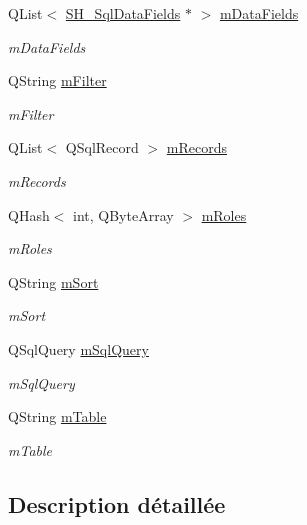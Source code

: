 \begin{DoxyCompactItemize}
\item 
Q\-List$<$ \hyperlink{classSH__SqlDataFields}{S\-H\-\_\-\-Sql\-Data\-Fields} $\ast$ $>$ \hyperlink{classSH__SqlDataModel_a3e998f75dd5b3193783612002461888d}{m\-Data\-Fields}
\begin{DoxyCompactList}\small\item\em m\-Data\-Fields \end{DoxyCompactList}\item 
Q\-String \hyperlink{classSH__SqlDataModel_af83c15ae3ad1dc4617dd58f2a852a1e2}{m\-Filter}
\begin{DoxyCompactList}\small\item\em m\-Filter \end{DoxyCompactList}\item 
Q\-List$<$ Q\-Sql\-Record $>$ \hyperlink{classSH__SqlDataModel_aa58096989daac3cd3fdea5e6dd4f27ee}{m\-Records}
\begin{DoxyCompactList}\small\item\em m\-Records \end{DoxyCompactList}\item 
Q\-Hash$<$ int, Q\-Byte\-Array $>$ \hyperlink{classSH__SqlDataModel_ad1e46c72a6aeb83e3e7bb0c3110d12a4}{m\-Roles}
\begin{DoxyCompactList}\small\item\em m\-Roles \end{DoxyCompactList}\item 
Q\-String \hyperlink{classSH__SqlDataModel_a7e36fd116b7cb50e949ee56af0c31772}{m\-Sort}
\begin{DoxyCompactList}\small\item\em m\-Sort \end{DoxyCompactList}\item 
Q\-Sql\-Query \hyperlink{classSH__SqlDataModel_a54f0cf057e3200f6b199508958e43fec}{m\-Sql\-Query}
\begin{DoxyCompactList}\small\item\em m\-Sql\-Query \end{DoxyCompactList}\item 
Q\-String \hyperlink{classSH__SqlDataModel_a88b8738a0d2803c94295c90c83d65f32}{m\-Table}
\begin{DoxyCompactList}\small\item\em m\-Table \end{DoxyCompactList}\end{DoxyCompactItemize}


\subsection{Description détaillée}


